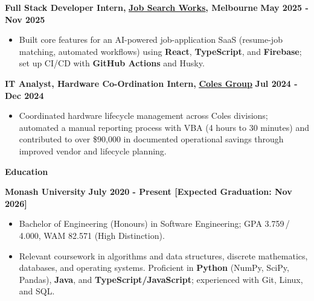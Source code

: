 \documentclass[11pt, a4paper]{article}
\let\hrefnoul\href
\renewcommand{\href}[2]{\hrefnoul{#1}{\ul{#2}}}
\newcommand{\resumesection}[1]{%
  \vspace{6pt}\par
  {\setlength{\fboxsep}{5pt}%
   \noindent\colorbox{sectionbg}{%
     \parbox{\dimexpr\linewidth-10pt\relax}{\strut\textbf{\large #1}\strut}%
   }}%
  \vspace{2pt}\par
}
\begin{document}
\vspace{3pt}
\noindent\textbf{Full Stack Developer Intern,}
\href{https://app.jobsearch.works/}{\textbf{Job Search Works}}\textbf{, Melbourne}%
\hfill\textbf{May 2025 - Nov 2025}

\begin{itemize}[leftmargin=1.5em, itemsep=2pt, topsep=1pt, parsep=0pt]
  \item Built core features for an AI-powered job-application SaaS (resume-job matching, automated
        workflows) using \textbf{React}, \textbf{TypeScript}, and \textbf{Firebase}; set up CI/CD
        with \textbf{GitHub Actions} and Husky.
\end{itemize}

\vspace{3pt}
\noindent\textbf{IT Analyst, Hardware Co-Ordination Intern,}
\href{https://www.linkedin.com/company/colesgroup/posts/?feedView=all}{\textbf{Coles Group}}%
\hfill\textbf{Jul 2024 - Dec 2024}

\begin{itemize}[leftmargin=1.5em, itemsep=2pt, topsep=1pt, parsep=0pt]
  \item Coordinated hardware lifecycle management across Coles divisions; automated a manual
        reporting process with VBA (4 hours to 30 minutes) and contributed to over \$90,000 in
        documented operational savings through improved vendor and lifecycle planning.
\end{itemize}

\resumesection{Education}

\noindent\textbf{Monash University}%
\hfill\textbf{July 2020 - Present [Expected Graduation: Nov 2026]}

\begin{itemize}[leftmargin=1.5em, itemsep=2pt, topsep=1pt, parsep=0pt]
  \item Bachelor of Engineering (Honours) in Software Engineering; GPA 3.759\,/\,4.000,
        WAM 82.571 (High Distinction).

  \item Relevant coursework in algorithms and data structures, discrete mathematics, databases,
        and operating systems. Proficient in \textbf{Python} (NumPy, SciPy, Pandas), \textbf{Java},
        and \textbf{TypeScript/JavaScript}; experienced with Git, Linux, and SQL.
\end{itemize}
\end{document}
